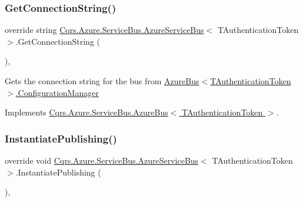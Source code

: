 \subsubsection{\texorpdfstring{Get\+Connection\+String()}{GetConnectionString()}}
{\footnotesize\ttfamily override string \hyperlink{classCqrs_1_1Azure_1_1ServiceBus_1_1AzureServiceBus}{Cqrs.\+Azure.\+Service\+Bus.\+Azure\+Service\+Bus}$<$ T\+Authentication\+Token $>$.Get\+Connection\+String (\begin{DoxyParamCaption}{ }\end{DoxyParamCaption})\hspace{0.3cm}{\ttfamily [protected]}, {\ttfamily [virtual]}}



Gets the connection string for the bus from \hyperlink{classCqrs_1_1Azure_1_1ServiceBus_1_1AzureBus_aaf9469d220fb23cb0521fa76b25ab228_aaf9469d220fb23cb0521fa76b25ab228}{Azure\+Bus$<$\+T\+Authentication\+Token$>$.\+Configuration\+Manager} 



Implements \hyperlink{classCqrs_1_1Azure_1_1ServiceBus_1_1AzureBus_a514e371d5ce093678365af31e6c274e3_a514e371d5ce093678365af31e6c274e3}{Cqrs.\+Azure.\+Service\+Bus.\+Azure\+Bus$<$ T\+Authentication\+Token $>$}.

\mbox{\label{classCqrs_1_1Azure_1_1ServiceBus_1_1AzureServiceBus_a5c286d29b0bbfe3770f3407efda57036_a5c286d29b0bbfe3770f3407efda57036}} 
\subsubsection{\texorpdfstring{Instantiate\+Publishing()}{InstantiatePublishing()}}
{\footnotesize\ttfamily override void \hyperlink{classCqrs_1_1Azure_1_1ServiceBus_1_1AzureServiceBus}{Cqrs.\+Azure.\+Service\+Bus.\+Azure\+Service\+Bus}$<$ T\+Authentication\+Token $>$.Instantiate\+Publishing (\begin{DoxyParamCaption}{ }\end{DoxyParamCaption})\hspace{0.3cm}{\ttfamily [protected]}, {\ttfamily [virtual]}}



